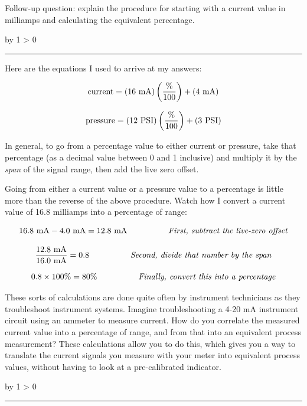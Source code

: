 \documentclass[12pt,a4paper]{article}
\def\oppgave{
            \advance\questnum by 1
            \ifnum \questnum > 0
                 \hrule
                 \vskip 3pt
                 \leftline{Oppgave \the\questnum}
                 \vskip 3pt \fi}
\def\notes{
           \advance\explnum by 1
           \ifnum \explnum > 0
                \hrule
                \vskip 3pt
                \leftline{Notes \the\explnum}
                \vskip 3pt \fi}
\begin{document}
Follow-up question: explain the procedure for starting with a current value in milliamps and calculating the equivalent percentage.

\vskip 10pt \filbreak 





\notes{} 

Here are the equations I used to arrive at my answers:

$$\hbox{current} = (16 \hbox{ mA}) \left( {\% \over 100}\right) + (4 \hbox{ mA})$$

$$\hbox{pressure} = (12 \hbox{ PSI}) \left( {\% \over 100}\right) + (3 \hbox{ PSI})$$

In general, to go from a percentage value to either current or pressure, take that percentage (as a decimal value between 0 and 1 inclusive) and multiply it by the {\it span} of the signal range, then add the live zero offset.

\vskip 10pt

Going from either a current value or a pressure value to a percentage is little more than the reverse of the above procedure.  Watch how I convert a current value of 16.8 milliamps into a percentage of range:

$$16.8 \hbox{ mA} - 4.0 \hbox{ mA} = 12.8 \hbox{ mA} \hskip 50pt \hbox{\it First, subtract the live-zero offset}$$

$${12.8 \hbox{ mA} \over 16.0 \hbox{ mA}} = 0.8 \hskip 50pt \hbox{\it Second, divide that number by the span}$$

$$0.8 \times 100\% = 80\% \hskip 50pt \hbox{\it Finally, convert this into a percentage}$$

These sorts of calculations are done quite often by instrument technicians as they troubleshoot instrument systems.  Imagine troubleshooting a 4-20 mA instrument circuit using an ammeter to measure current.  How do you correlate the measured current value into a percentage of range, and from that into an equivalent process measurement?  These calculations allow you to do this, which gives you a way to translate the current signals you measure with your meter into equivalent process values, without having to look at a pre-calibrated indicator.



\vfil \eject 



\oppgave{} 
\end{document}
